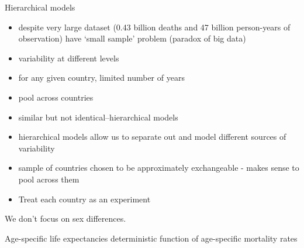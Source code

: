 \documentclass[11pt]{article}\usepackage[]{graphicx}\usepackage[]{color}
\begin{document}
 Hierarchical models
 \begin{itemize}
   \item despite very large dataset (0.43 billion deaths and  47 billion person-years of observation) have `small sample' problem (paradox of big data)
   \item variability at different levels
   \item for any given country, limited number of years
   \item pool across countries
   \item similar but not identical--hierarchical models
   \item hierarchical models allow us to separate out and model different sources of variability
   \item sample of countries chosen to be approximately exchangeable - makes sense to pool across them
   \item Treat each country as an experiment
 \end{itemize}
 
 We don't focus on sex differences.
 
 
 Age-specific life expectancies deterministic function of age-specific mortality rates
 
  
  


\end{document}
